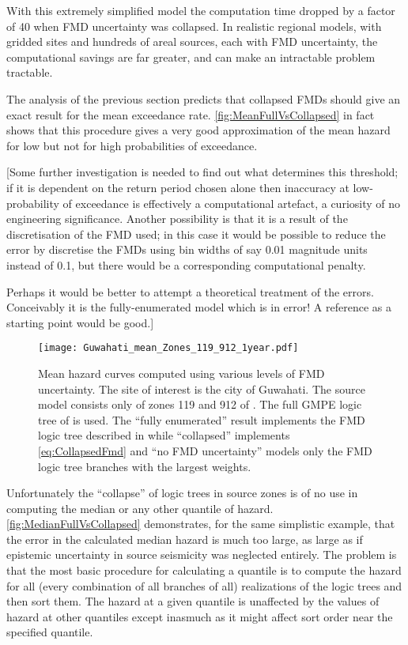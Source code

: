 \documentclass{article}
\begin{document}
With this extremely simplified model the computation time dropped by a factor of 40 when FMD uncertainty was collapsed. 
In realistic regional models, with gridded sites and hundreds of areal sources, each with FMD uncertainty, the computational savings are far greater, and can make an intractable problem tractable. 

The analysis of the previous section predicts that collapsed FMDs should give an exact result for the mean exceedance rate. 
\autoref{fig:MeanFullVsCollapsed} in fact shows that this procedure gives a very good approximation of the mean hazard for low but not for high probabilities of exceedance. 

[Some further investigation is needed to find out what determines this threshold; if it is dependent on the return period chosen alone then inaccuracy at low-probability of exceedance is effectively a computational artefact, a curiosity of no engineering significance. 
Another possibility is that it is a result of the discretisation of the FMD used; in this case it would be possible to reduce the error by discretise the FMDs using bin widths of say 0.01 magnitude units instead of 0.1, but there would be a corresponding computational penalty.

Perhaps it would be better to attempt a theoretical treatment of the errors. Conceivably it is the fully-enumerated model which is in error! A reference as a starting point would be good.]

\begin{figure}[!htb]
\begin{adjustbox}{center}
\texttt{[image: Guwahati\_mean\_Zones\_119\_912\_1year.pdf]}
\end{adjustbox}
\caption[Mean hazard curves computed using various levels of FMD uncertainty]{Mean hazard curves computed using various levels of FMD uncertainty. 
The site of interest is the city of Guwahati. 
The source model consists only of zones 119 and 912 of \cite{nath2012probabilistic}. 
The full GMPE logic tree of \cite{nath2012probabilistic} is used. 
The ``fully enumerated'' result implements the FMD logic tree described in \cite{nath2012probabilistic} while ``collapsed'' implements \eqref{eq:CollapsedFmd} and ``no FMD uncertainty'' models only the FMD logic tree branches with the largest weights.} 
\label{fig:MeanFullVsCollapsed}
\end{figure}

Unfortunately the ``collapse'' of logic trees in source zones is of no use in computing the median or any other quantile of hazard.
\autoref{fig:MedianFullVsCollapsed} demonstrates, for the same simplistic example, that the error in the calculated median hazard is much too large, as large as if epistemic uncertainty in source seismicity was neglected entirely.
The problem is that the most basic procedure for calculating a quantile is to compute the hazard for all (every combination of all branches of all) realizations of the logic trees and then sort them.
The hazard at a given quantile is unaffected by the values of hazard at other quantiles except inasmuch as it might affect sort order near the specified quantile.
\end{document}
